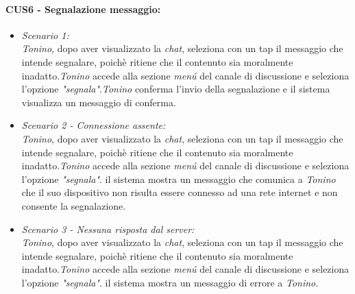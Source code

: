 \paragraph{CUS6 - Segnalazione messaggio:\\}
\begin{itemize}
	\item \textit{Scenario 1:\\}
	\textit{Tonino}, dopo aver visualizzato la \textit{chat}, seleziona con un tap il messaggio che intende segnalare, poichè ritiene che il contenuto sia moralmente inadatto.\textit{Tonino} accede alla sezione \textit{menú} del canale di discussione e seleziona l'opzione \textit{"segnala"}.\textit{Tonino} conferma l'invio della segnalazione e il sistema visualizza un messaggio di conferma.\\
	
	\item \textit{Scenario 2 - Connessione assente:\\}
	\textit{Tonino}, dopo aver visualizzato la \textit{chat}, seleziona con un tap il messaggio che intende segnalare, poichè ritiene che il contenuto sia moralmente inadatto.\textit{Tonino} accede alla sezione \textit{menú} del canale di discussione e seleziona l'opzione \textit{"segnala"}. il sistema mostra un messaggio che comunica a \textit{Tonino} che il suo dispositivo non risulta essere connesso ad una rete internet e non consente la segnalazione.\\
	
	\item \textit{Scenario 3 - Nessuna risposta dal server:\\}
	\textit{Tonino}, dopo aver visualizzato la \textit{chat}, seleziona con un tap il messaggio che intende segnalare, poichè ritiene che il contenuto sia moralmente inadatto.\textit{Tonino} accede alla sezione \textit{menú} del canale di discussione e seleziona l'opzione \textit{"segnala"}. il sistema mostra un messaggio di errore a \textit{Tonino}.
\end{itemize}

